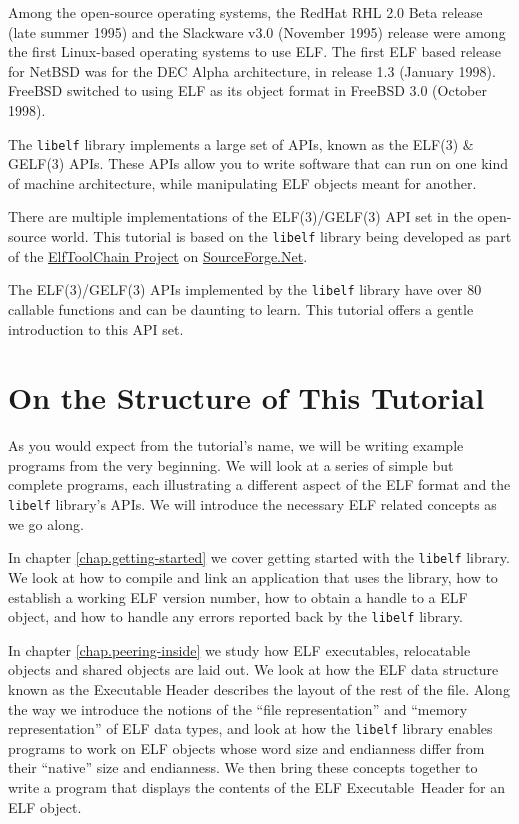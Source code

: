 \documentclass[a4paper,pdftex]{book}
\newcommand{\elftoolchainproject}{\href{https://elftoolchain.sourceforge.io/}%
    {ElfToolChain Project}\xspace}%
\newcommand{\library}[1]{\texttt{#1}}
\newcommand{\reg}{\textregistered\xspace}
\newcommand{\trade}{\texttrademark\xspace}
\newcommand{\elfdatastructure}[1]{\textsf{#1}}
\begin{document}
Among the open-source operating systems, the
RedHat\trade RHL 2.0 Beta release (late summer 1995) and the Slackware
v3.0 (November 1995) release were among the first Linux\reg-based
operating systems to use ELF.  The first ELF based release for
NetBSD\trade was for the DEC Alpha\trade architecture, in release 1.3
(January 1998).  FreeBSD\trade switched to using ELF as its object
format in FreeBSD 3.0 (October 1998).

The \library{libelf} library implements a large set of APIs, known as
the ELF(3) \& GELF(3) APIs.
These APIs allow you to write software that can run on one kind of
machine architecture, while manipulating ELF objects meant for
another.

There are multiple implementations of the ELF(3)/GELF(3) API set in
the open-source world.  This tutorial is based on the \library{libelf}
library being developed as part of the \elftoolchainproject on
\href{https://sourceforge.net/}{SourceForge.Net}.

The ELF(3)/GELF(3) APIs implemented by the \library{libelf} library
have over 80 callable functions and can be daunting to learn.  This
tutorial offers a gentle introduction to this API set.

\section{On the Structure of This Tutorial}

As you would expect from the tutorial's name, we will be writing
example programs from the very beginning. We will look at a series of
simple but complete programs, each illustrating a different aspect of
the ELF format and the \library{libelf} library's APIs. We will
introduce the necessary ELF related concepts as we go along.

In chapter \vref{chap.getting-started} we cover getting started
with the \library{libelf} library. We look at how to compile and link
an application that uses the library, how to establish a working ELF
version number, how to obtain a handle to a ELF object, and how to
handle any errors reported back by the \library{libelf} library.

In chapter \vref{chap.peering-inside} we study how ELF executables,
relocatable objects and shared objects are laid out. We look at how
the ELF data structure known as the \elfdatastructure{Executable
  Header} describes the layout of the rest of
the file.  Along the way we introduce the notions of the ``file
representation'' and ``memory
representation'' of ELF data types, and
look at how the \library{libelf} library enables programs to work
on ELF objects whose word size and endianness differ from their
``native'' size and endianness. We then bring these concepts together
to write a program that displays the contents of the ELF
\elfdatastructure{Executable~Header} for an
ELF object.
\end{document}

